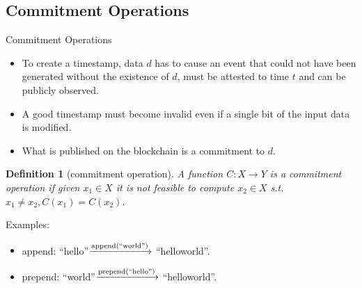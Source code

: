 \documentclass[usenames,dvipsnames]{beamer}
\newtheorem{mydef}{\alert{Definition}}[section]
\begin{document}
    \subsection{Commitment Operations}
    \begin{frame}{Commitment Operations}
        \begin{itemize}
            \item To create a timestamp, data $d$ has to \alert{cause} an event that could not have been generated without the existence of $d$, must be \alert{attested} to time $t$ and can be \alert{publicly observed}.
            \item A \alert{good} timestamp must become \alert{invalid} even if a \alert{single bit} of the input data is modified.
            \item What is published on the blockchain is a \alert{commitment} to $d$.
            \end{itemize}
            \begin{mydef}[commitment operation]
            A function $C: X \rightarrow Y$ is a commitment operation if given $x_{1} \in X$ it is not feasible to compute $x_{2} \in X$ s.t. $x_{1} \neq x_{2}, C(x_{1}) = C(x_{2})$.
            \end{mydef}
            \alert{Examples}:
            \begin{itemize}
                \item append: \textquotedblleft hello\textquotedblright $\xrightarrow{\text{append(\textquotedblleft world\textquotedblright)}}$ \textquotedblleft helloworld\textquotedblright.
                \item prepend: \textquotedblleft world\textquotedblright $\xrightarrow{\text{prepend(\textquotedblleft hello\textquotedblright)}}$ \textquotedblleft helloworld\textquotedblright.
            \end{itemize}
    \end{frame}
    
\end{document}
